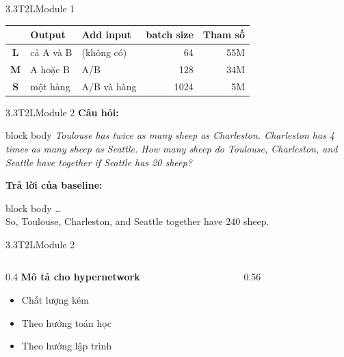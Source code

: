 \begin{frame}{3.3\quad T2L}{Module 1}
  \centering{}\par
  \vspace{0.8em}
  \renewcommand{\arraystretch}{1.15}
  \begin{tabular}{@{}c l l r r@{}}
    \toprule
    & \textbf{Output} & \textbf{Add input} & \textbf{batch size} & \textbf{Tham số} \\
    \midrule
    \textbf{L} & cả A và B & (không có)  & 64   & 55M \\
    \textbf{M} & A hoặc B  & A/B         & 128  & 34M \\
    \textbf{S} & một hàng  & A/B và hàng & 1024 & 5M \\
    \bottomrule
  \end{tabular}
\end{frame}

\begin{frame}{3.3\quad T2L}{Module 2}
  \textbf{Câu hỏi:}
  \begin{beamercolorbox}[wd=\linewidth,sep=0.6em]{block body}
    \itshape Toulouse has twice as many sheep as Charleston. Charleston has 4 times as many
    sheep as Seattle. How many sheep do Toulouse, Charleston, and Seattle have together if
    Seattle has 20 sheep?
  \end{beamercolorbox}
  \vspace{1em}
  \textbf{Trả lời của baseline:}
  \begin{beamercolorbox}[wd=\linewidth,sep=0.6em]{block body}
    \dots\\
    So, Toulouse, Charleston, and Seattle together have \colorbox{red!20}{240 sheep.}
  \end{beamercolorbox}
\end{frame}

\begin{frame}{3.3\quad T2L}{Module 2}
  \begin{columns}[T,onlytextwidth]
    \begin{column}{0.4\textwidth}
      \vspace{0.6em}
      \textbf{Mô tả cho hypernetwork}
      \begin{itemize}\setlength{\itemsep}{0.4em}
        \item Chất lượng kém
        \item Theo hướng toán học
        \item Theo hướng lập trình
      \end{itemize}
    \end{column}
    \begin{column}{0.56\textwidth}
      \centering{}
    \end{column}
  \end{columns}
\end{frame}

